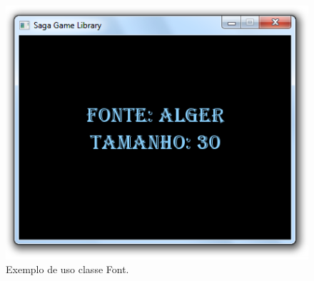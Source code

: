\begin{figure}[H]
    \centering
    \includegraphics[scale = 0.70]{Imagens/ExemploFont.png}
    \caption{Exemplo de uso classe Font.}
    \label{ExemploFont}
\end{figure}
%
%
%
